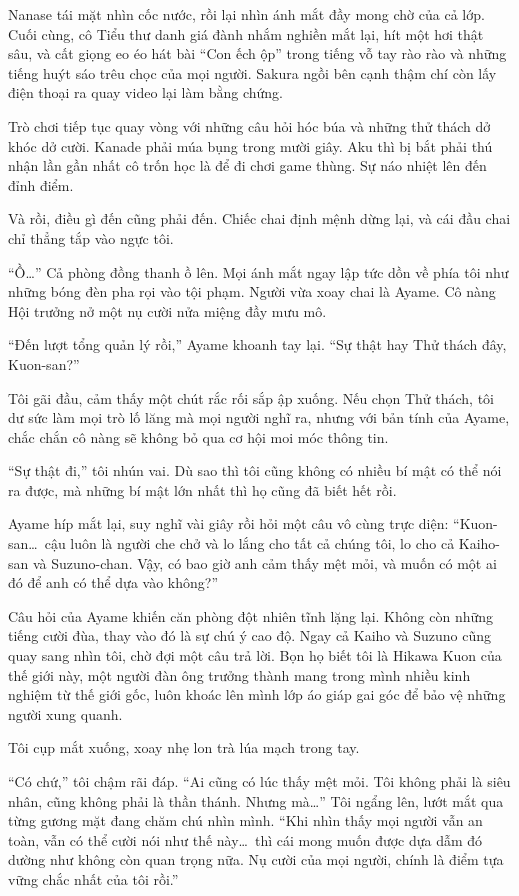 \documentclass[../main.tex]{subfiles}
\begin{document}
Nanase tái mặt nhìn cốc nước, rồi lại nhìn ánh mắt đầy mong chờ của cả lớp. Cuối cùng, cô Tiểu thư danh giá đành nhắm nghiền mắt lại, hít một hơi thật sâu, và cất giọng eo éo hát bài ``Con ếch ộp'' trong tiếng vỗ tay rào rào và những tiếng huýt sáo trêu chọc của mọi người. Sakura ngồi bên cạnh thậm chí còn lấy điện thoại ra quay video lại làm bằng chứng.

Trò chơi tiếp tục quay vòng với những câu hỏi hóc búa và những thử thách dở khóc dở cười. Kanade phải múa bụng trong mười giây. Aku thì bị bắt phải thú nhận lần gần nhất cô trốn học là để đi chơi game thùng. Sự náo nhiệt lên đến đỉnh điểm.

Và rồi, điều gì đến cũng phải đến. Chiếc chai định mệnh dừng lại, và cái đầu chai chỉ thẳng tắp vào ngực tôi.

``Ồ\dots'' Cả phòng đồng thanh ồ lên. Mọi ánh mắt ngay lập tức dồn về phía tôi như những bóng đèn pha rọi vào tội phạm. Người vừa xoay chai là Ayame. Cô nàng Hội trưởng nở một nụ cười nửa miệng đầy mưu mô.

``Đến lượt tổng quản lý rồi,'' Ayame khoanh tay lại. ``Sự thật hay Thử thách đây, Kuon-san?''

Tôi gãi đầu, cảm thấy một chút rắc rối sắp ập xuống. Nếu chọn Thử thách, tôi dư sức làm mọi trò lố lăng mà mọi người nghĩ ra, nhưng với bản tính của Ayame, chắc chắn cô nàng sẽ không bỏ qua cơ hội moi móc thông tin.

``Sự thật đi,'' tôi nhún vai. Dù sao thì tôi cũng không có nhiều bí mật có thể nói ra được, mà những bí mật lớn nhất thì họ cũng đã biết hết rồi.

Ayame híp mắt lại, suy nghĩ vài giây rồi hỏi một câu vô cùng trực diện: ``Kuon-san\dots\ cậu luôn là người che chở và lo lắng cho tất cả chúng tôi, lo cho cả Kaiho-san và Suzuno-chan. Vậy, có bao giờ anh cảm thấy mệt mỏi, và muốn có một ai đó để anh có thể dựa vào không?''

Câu hỏi của Ayame khiến căn phòng đột nhiên tĩnh lặng lại. Không còn những tiếng cười đùa, thay vào đó là sự chú ý cao độ. Ngay cả Kaiho và Suzuno cũng quay sang nhìn tôi, chờ đợi một câu trả lời. Bọn họ biết tôi là Hikawa Kuon của thế giới này, một người đàn ông trưởng thành mang trong mình nhiều kinh nghiệm từ thế giới gốc, luôn khoác lên mình lớp áo giáp gai góc để bảo vệ những người xung quanh.

Tôi cụp mắt xuống, xoay nhẹ lon trà lúa mạch trong tay.

``Có chứ,'' tôi chậm rãi đáp. ``Ai cũng có lúc thấy mệt mỏi. Tôi không phải là siêu nhân, cũng không phải là thần thánh. Nhưng mà\dots'' Tôi ngẩng lên, lướt mắt qua từng gương mặt đang chăm chú nhìn mình. ``Khi nhìn thấy mọi người vẫn an toàn, vẫn có thể cười nói như thế này\dots\ thì cái mong muốn được dựa dẫm đó dường như không còn quan trọng nữa. Nụ cười của mọi người, chính là điểm tựa vững chắc nhất của tôi rồi.''
\end{document}
